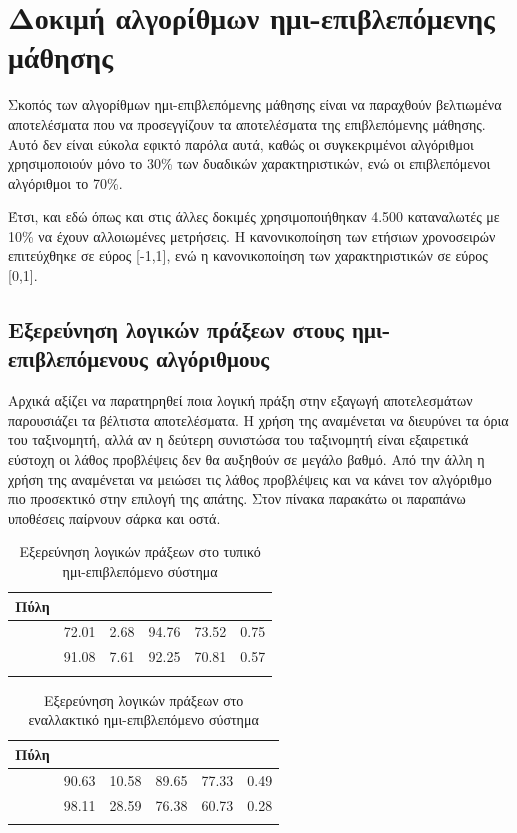\section{Δοκιμή αλγορίθμων ημι-επιβλεπόμενης μάθησης}
Σκοπός των αλγορίθμων ημι-επιβλεπόμενης μάθησης είναι να παραχθούν βελτιωμένα αποτελέσματα που να προσεγγίζουν τα αποτελέσματα της επιβλεπόμενης μάθησης. Αυτό δεν είναι εύκολα εφικτό παρόλα αυτά, καθώς οι συγκεκριμένοι αλγόριθμοι χρησιμοποιούν μόνο το 30\% των δυαδικών χαρακτηριστικών, ενώ οι επιβλεπόμενοι αλγόριθμοι το 70\%.\par
Έτσι, και εδώ όπως και στις άλλες δοκιμές χρησιμοποιήθηκαν 4.500 καταναλωτές με 10\% να έχουν αλλοιωμένες μετρήσεις.  Η κανονικοποίηση των ετήσιων χρονοσειρών επιτεύχθηκε σε εύρος [-1,1], ενώ η κανονικοποίηση των χαρακτηριστικών σε εύρος [0,1].
\subsection{Εξερεύνηση λογικών πράξεων στους ημι-επιβλεπόμενους αλγόριθμους}
Αρχικά αξίζει να παρατηρηθεί ποια λογική πράξη στην εξαγωγή αποτελεσμάτων παρουσιάζει τα βέλτιστα αποτελέσματα. Η χρήση της  αναμένεται να διευρύνει τα όρια του ταξινομητή, αλλά αν η δεύτερη συνιστώσα του ταξινομητή είναι εξαιρετικά εύστοχη οι λάθος προβλέψεις δεν θα αυξηθούν σε μεγάλο βαθμό. Από την άλλη η χρήση της  αναμένεται να μειώσει τις λάθος προβλέψεις και να κάνει τον αλγόριθμο πιο προσεκτικό στην επιλογή της απάτης. Στον πίνακα παρακάτω οι παραπάνω υποθέσεις παίρνουν σάρκα και οστά.
\begin{center}
\begin{longtabu} to 0.8\textwidth { | X[c] || X[c] | X[c] | X[c] | X[c] | X[c] |  }
 \hline
 Πύλη &   &  &  &  & \\
\hline
  & 72.01 & 2.68 & 94.76 & 73.52 & 0.75\\
 \hline
 & 91.08 & 7.61 &  92.25 & 70.81 & 0.57\\ 
\hline
\caption{Εξερεύνηση λογικών πράξεων στο τυπικό ημι-επιβλεπόμενο σύστημα}
\label{tab:testlogicopersemisup1}
\end{longtabu}
\end{center}

\begin{center}
\begin{longtabu} to 0.8\textwidth { | X[c] || X[c] | X[c] | X[c] | X[c] | X[c] |  }
 \hline
 Πύλη &   &  &  &  & \\
\hline
  & 90.63 & 10.58 & 89.65 & 77.33 & 0.49\\
 \hline
 & 98.11 & 28.59 & 76.38 & 60.73 & 0.28\\ 
\hline
\caption{Εξερεύνηση λογικών πράξεων στο εναλλακτικό ημι-επιβλεπόμενο σύστημα}
\label{tab:testlogicopersemisup2}
\end{longtabu}
\end{center}

